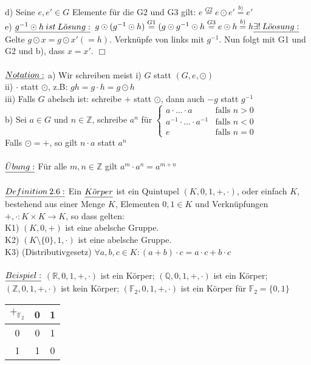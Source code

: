 \documentclass[fleqn, a4paper, 11pt]{article}
\begin{document}
d) Seine $e,e'\in G$ Elemente f\"ur die G2 und G3 gilt: $e\stackrel{G2}{=} e\odot e'\stackrel{b)}{=} e'$\\
e) $\uline{g^{-1}\odot h\:ist\:L\ddot{o}sung:}$ $g\odot (g^{-1}\odot h)\stackrel{G1}{=}(g\odot g^{-1}\odot h\stackrel{G3}{=} e\odot h\stackrel{b)}{=} h\\
\uline{\exists!\:L\ddot{o}osung:}$ Gelte $g\odot x=g\odot x'(=h)$. Verkn\"upfe von links mit $g^{-1}$. Nun folgt mit G1 und G2 und b), dass $x=x'$. \hfill $\Box$\\
\\
$\uline{Notation:}$ a) Wir schreiben meist i) $G$ statt $(G,e,\odot)$\\
ii) $\cdot$ statt $\odot$, z.B: $gh=g\cdot h=g\odot h$\\
iii) Falls $G$ abelsch ist: schreibe $+$ statt $\odot$, dann auch $-g$ statt $g^{-1}$\\
b) Sei $a\in G$ und $n\in\mathbb{Z}$, schreibe $a^{n}$ f\"ur
$\begin{cases}
	a\cdot...\cdot a & \text{falls }n>0\\
	a^{-1}\cdot...\cdot a^{-1} & \text{falls }n<0\\
	e & \text{falls } n=0
\end{cases}$\\
Falls $\odot=+$, so gilt $n\cdot a$ statt $a^{n}$\\
\\
$\uline{\ddot{U}bung:}$ F\"ur alle $m,n\in\mathbb{Z}$ gilt $a^{m}\cdot a^{n}=a^{m+n}$\\
\\
$\uline{Definition\:2.6:}$ Ein $\uline{K\ddot{o}rper}$ ist ein Quintupel $(K,0,1,+,\cdot)$, oder einfach $K$, bestehend aus einer Menge $K$, Elementen $0,1\in K$ und Verkn\"upfungen $+,\cdot:K\times K\rightarrow K$, so dass gelten:\\
K1) $(K,0,+)$ ist eine abelsche Gruppe.\\
K2) $(K\setminus\{0\},1,\cdot)$ ist eine abelsche Gruppe.\\
K3) (Distributivgesetz) $\forall a,b,c\in K:(a+b)\cdot c=a\cdot c+b\cdot c$\\
\\
$\uline{Beispiel:}$ $(\mathbb{R},0,1,+,\cdot)$ ist ein K\"orper; $(\mathbb{Q},0,1,+,\cdot)$ ist ein K\"orper; $(\mathbb{Z},0,1,+,\cdot)$ ist kein K\"orper; $(\mathbb{F}_{2},0,1,+,\cdot)$ ist ein K\"orper f\"ur $\mathbb{F}_{2}=\{0,1\}$\\
\begin{tabular}{|c|cc|}
	\hline
	$+_{\mathbb{F}_{2}}$ & 0 & 1 \\
	\hline
	0 & 0 & 1\\
	1 & 1 & 0\\
	\hline
\end{tabular}\\
\end{document}
